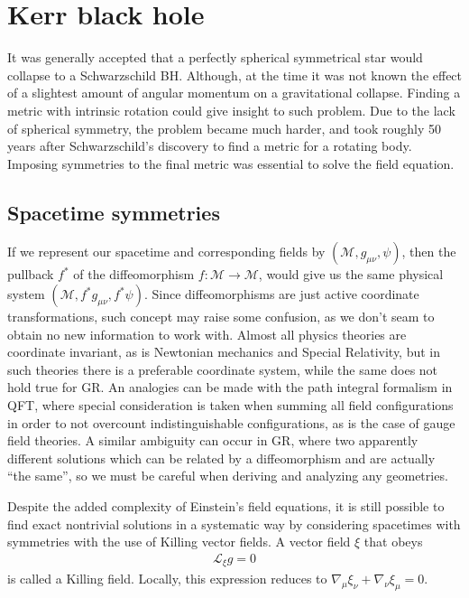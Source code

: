 \section{Kerr black hole}

It was generally accepted that a perfectly spherical symmetrical star would collapse to a Schwarzschild BH. 
Although, at the time it was not known the effect of a slightest amount of angular momentum on a gravitational collapse.
Finding a metric with intrinsic rotation could give insight to such problem. Due to the lack of spherical symmetry, the problem became much harder, and took roughly 50 years after Schwarzschild's discovery to find a metric for a rotating body.
Imposing symmetries to the final metric was essential to solve the field equation.

\subsection{Spacetime symmetries}

If we represent our spacetime and corresponding fields by $(\mathcal{M}, g_{\mu\nu}, \psi)$, then the pullback $f^*$ of the diffeomorphism $f:\mathcal{M}\rightarrow\mathcal{M}$, would give us the same physical system $(\mathcal{M}, f^* g_{\mu\nu}, f^* \psi)$.
Since diffeomorphisms are just active coordinate transformations, such concept may raise some confusion, as we don't seam to obtain no new information to work with. 
Almost all physics theories are coordinate invariant, as is Newtonian mechanics and Special Relativity, but in such theories there is a preferable coordinate system, while the same does not hold true for GR.
An analogies can be made with the path integral formalism in QFT, where special consideration is taken when summing all field configurations in order to not overcount indistinguishable configurations, as is the case of gauge field theories.
A similar ambiguity can occur in GR, where two apparently different solutions which can be related by a diffeomorphism and are actually ``the same'', so we must be careful when deriving and analyzing any geometries.

Despite the added complexity of Einstein's field equations, it is still possible to find exact nontrivial solutions in a systematic way by considering spacetimes with symmetries with the use of Killing vector fields.
A vector field $\xi$ that obeys
\begin{align}
    \mathcal{L}_\xi  g = 0  
    \label{eq2:killing}
\end{align}
is called a Killing field. Locally, this expression reduces to $\nabla_\mu \xi_\nu + \nabla_\nu \xi_\mu = 0$.

